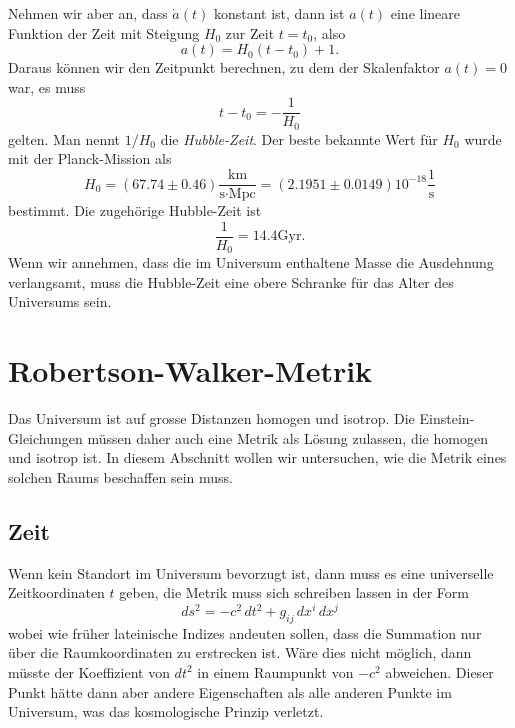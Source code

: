 Nehmen wir aber an, dass $\dot a(t)$ konstant ist, dann ist $a(t)$
eine lineare Funktion der Zeit mit Steigung  $H_0$ zur Zeit $t=t_0$,
also
\[
a(t)=H_0(t-t_0) + 1.
\]
Daraus können wir den Zeitpunkt berechnen, zu dem der Skalenfaktor
$a(t)=0$ war, es muss
\[
t-t_0 = -\frac1{H_0}
\]
gelten.
Man nennt $1/H_0$ die {\em Hubble-Zeit}.
Der beste bekannte Wert für $H_0$ wurde mit der Planck-Mission als
\begin{equation}
H_0
=
(67.74 \pm 0.46)\frac{\text{km}}{\text{s}\cdot\text{Mpc}}
=
(2.1951\pm 0.0149)
10^{-18}\frac{1}{\text{s}}
\label{skript:robertson:hubble0}
\end{equation}
bestimmt.
Die zugehörige Hubble-Zeit ist
\begin{equation}
\frac{1}{H_0} = 14.4\text{Gyr}.
\label{skript:robertson:hubblezeit}
\end{equation}
Wenn wir annehmen, dass die im Universum enthaltene Masse die Ausdehnung
verlangsamt, muss die Hubble-Zeit eine obere Schranke für das Alter
des Universums sein.

\section{Robertson-Walker-Metrik}
Das Universum ist auf grosse Distanzen homogen und isotrop.
Die Einstein-Gleichungen müssen daher auch eine Metrik als
Lösung zulassen, die homogen und isotrop ist.
In diesem Abschnitt wollen wir untersuchen, wie die Metrik eines
solchen Raums beschaffen sein muss.

\subsection{Zeit}
Wenn kein Standort im Universum bevorzugt ist, dann muss es
eine universelle Zeitkoordinaten $t$ geben, die Metrik muss
sich schreiben lassen in der Form
\[
ds^2
=
-c^2\,dt^2
+
g_{ij}\,dx^i\,dx^j
\]
wobei wie früher lateinische Indizes andeuten sollen, dass die
Summation nur über die Raumkoordinaten zu erstrecken ist.
Wäre dies nicht möglich, dann müsste der Koeffizient von $dt^2$
in einem Raumpunkt von $-c^2$ abweichen.
Dieser Punkt hätte dann aber andere Eigenschaften als alle anderen
Punkte im Universum, was das kosmologische Prinzip verletzt.

